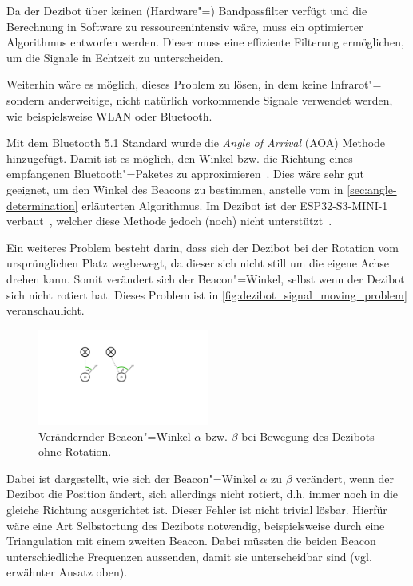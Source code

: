 Da der Dezibot über keinen (Hardware"=) Bandpassfilter verfügt und die Berechnung in Software zu ressourcenintensiv wäre, muss ein optimierter Algorithmus entworfen werden. Dieser muss eine effiziente Filterung ermöglichen, um die Signale in Echtzeit zu unterscheiden.

Weiterhin wäre es möglich, dieses Problem zu lösen, in dem keine Infrarot"= sondern anderweitige, nicht natürlich vorkommende Signale verwendet werden, wie beispielsweise WLAN oder Bluetooth.

Mit dem Bluetooth 5.1 Standard wurde die \emph{Angle of Arrival} (AOA) Methode hinzugefügt. Damit ist es möglich, den Winkel bzw. die Richtung eines empfangenen Bluetooth"=Paketes zu approximieren~\cite[][Abschnitt 8.1]{bluetoothsigincBluetoothCoreSpecification2019}. Dies wäre sehr gut geeignet, um den Winkel des Beacons zu bestimmen, anstelle vom in \autoref{sec:angle-determination} erläuterten Algorithmus. Im Dezibot ist der ESP32-S3-MINI-1 verbaut~\cite{fingerleDokumentationDezibot42025}, welcher diese Methode jedoch (noch) nicht unterstützt~\cite{espressifsystemsshanghaico.ltdMajorFeatureSupport2024}.

Ein weiteres Problem besteht darin, dass sich der Dezibot bei der Rotation vom ursprünglichen Platz wegbewegt, da dieser sich nicht still um die eigene Achse drehen kann. Somit verändert sich der Beacon"=Winkel, selbst wenn der Dezibot sich nicht rotiert hat. Dieses Problem ist in \autoref{fig:dezibot_signal_moving_problem} veranschaulicht.

\begin{figure}[h]
    \centering
    \includegraphics[width=0.5\textwidth]{../assets/dezibot_signal_moving_problem.pdf}
    \caption{Verändernder Beacon"=Winkel $\alpha$ bzw. $\beta$ bei Bewegung des Dezibots ohne Rotation.}
    \label{fig:dezibot_signal_moving_problem}
\end{figure}

Dabei ist dargestellt, wie sich der Beacon"=Winkel $\alpha$ zu $\beta$ verändert, wenn der Dezibot die Position ändert, sich allerdings nicht rotiert, d.h. immer noch in die gleiche Richtung ausgerichtet ist. Dieser Fehler ist nicht trivial lösbar. Hierfür wäre eine Art Selbstortung des Dezibots notwendig, beispielsweise durch eine Triangulation mit einem zweiten Beacon. Dabei müssten die beiden Beacon unterschiedliche Frequenzen aussenden, damit sie unterscheidbar sind (vgl. erwähnter Ansatz oben).

